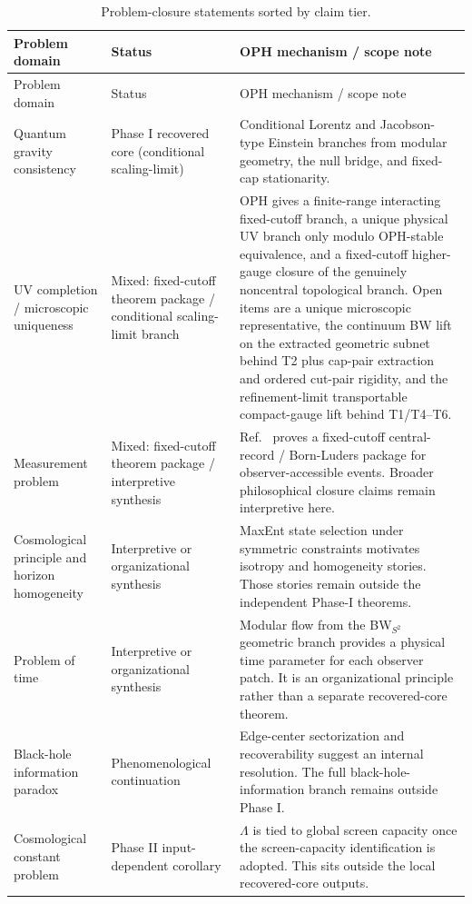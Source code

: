 \begin{longtable}{p{} p{} p{}}
\caption{Problem-closure statements sorted by claim tier.}\label{tab:additional-closures}\\
\toprule
Problem domain & Status & OPH mechanism / scope note \\
\midrule
\endfirsthead
\toprule
Problem domain & Status & OPH mechanism / scope note \\
\midrule
\endhead
\bottomrule
\endfoot
Quantum gravity consistency & Phase I recovered core (conditional scaling-limit) & Conditional Lorentz and Jacobson-type Einstein branches from modular geometry, the null bridge, and fixed-cap stationarity. \\
UV completion / microscopic uniqueness & Mixed: fixed-cutoff theorem package / conditional scaling-limit branch & OPH gives a finite-range interacting fixed-cutoff branch, a unique physical UV branch only modulo OPH-stable equivalence, and a fixed-cutoff higher-gauge closure of the genuinely noncentral topological branch. Open items are a unique microscopic representative, the continuum BW lift on the extracted geometric subnet behind T2 plus cap-pair extraction and ordered cut-pair rigidity, and the refinement-limit transportable compact-gauge lift behind T1/T4--T6. \\
Measurement problem & Mixed: fixed-cutoff theorem package / interpretive synthesis & Ref.~\cite{ophmicrophysics} proves a fixed-cutoff central-record / Born-Luders package for observer-accessible events. Broader philosophical closure claims remain interpretive here. \\
Cosmological principle and horizon homogeneity & Interpretive or organizational synthesis & MaxEnt state selection under symmetric constraints motivates isotropy and homogeneity stories. Those stories remain outside the independent Phase-I theorems. \\
Problem of time & Interpretive or organizational synthesis & Modular flow from the BW\(_{S^2}\) geometric branch provides a physical time parameter for each observer patch. It is an organizational principle rather than a separate recovered-core theorem. \\
Black-hole information paradox & Phenomenological continuation & Edge-center sectorization and recoverability suggest an internal resolution. The full black-hole-information branch remains outside Phase I. \\
Cosmological constant problem & Phase II input-dependent corollary & \(\Lambda\) is tied to global screen capacity once the screen-capacity identification is adopted. This sits outside the local recovered-core outputs. \\

\end{longtable}
